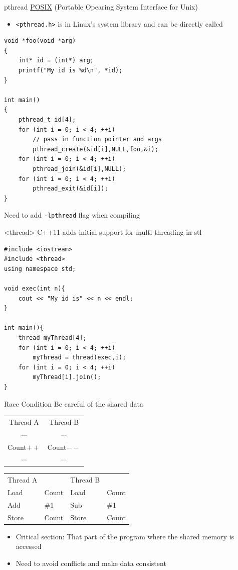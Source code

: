 \documentclass{../TexTemplate/myslide}
\begin{document}
\begin{frame}[fragile]{pthread}
\href{https://en.wikipedia.org/wiki/POSIX_Threads}{POSIX} (Portable Opearing System Interface for Unix)
\begin{itemize}
\item \verb'<pthread.h>' is in Linux's system library and can be directly called
\end{itemize}
\begin{lstlisting}[basicstyle=\scriptsize]
void *foo(void *arg)
{
	int* id = (int*) arg;
	printf("My id is %d\n", *id);
}

int main()
{
	pthread_t id[4];
	for (int i = 0; i < 4; ++i)
		// pass in function pointer and args
		pthread_create(&id[i],NULL,foo,&i);
	for (int i = 0; i < 4; ++i)
		pthread_join(&id[i],NULL);
	for (int i = 0; i < 4; ++i)
		pthread_exit(&id[i]);
}
\end{lstlisting}
Need to add \verb'-lpthread' flag when compiling
\end{frame}

\begin{frame}[fragile]{<thread>}
C++11 adds initial support for multi-threading in stl
\begin{lstlisting}
#include <iostream>
#include <thread>
using namespace std;

void exec(int n){
	cout << "My id is" << n << endl;
}

int main(){
	thread myThread[4];
	for (int i = 0; i < 4; ++i)
		myThread = thread(exec,i);
	for (int i = 0; i < 4; ++i)
		myThread[i].join();
}
\end{lstlisting}
\end{frame}

\begin{frame}{Race Condition}
Be careful of the shared data
\begin{center}
\begin{tabular}{c|c}
Thread A & Thread B\\
$\cdots$ & $\cdots$\\
Count$++$ & Count$--$\\
$\cdots$ & $\cdots$
\end{tabular}\quad
\begin{tabular}{ll|ll}
Thread A & & Thread B\\
Load & Count & Load & Count\\
Add & \#1 & Sub & \#1\\
Store & Count & Store & Count
\end{tabular}
\end{center}
\begin{itemize}
	\item Critical section: That part of the program where the shared memory is accessed
	\item Need to avoid conflicts and make data consistent
\end{itemize}
\end{frame}
\end{document}
